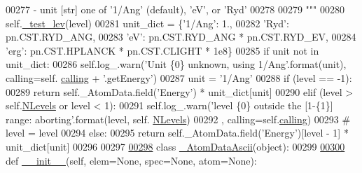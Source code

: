 \begin{DoxyCode}
{00277 \textcolor{stringliteral}{            - unit   [str] one of '1/Ang' (default), 'eV', or 'Ryd'    }
00278 \textcolor{stringliteral}{            }
00279 \textcolor{stringliteral}{        """}
00280         self.\hyperlink{classpyneb_1_1core_1_1pynebcore_1_1___atom_data_fits_ae83c63a7bd651275de23e5f17ddcf999}{\_test\_lev}(level)
00281         unit\_dict = \{\textcolor{stringliteral}{'1/Ang'}: 1.,
00282                      \textcolor{stringliteral}{'Ryd'}: pn.CST.RYD\_ANG,
00283                      \textcolor{stringliteral}{'eV'}: pn.CST.RYD\_ANG * pn.CST.RYD\_EV,
00284                      \textcolor{stringliteral}{'erg'}: pn.CST.HPLANCK * pn.CST.CLIGHT * 1e8\}
00285         \textcolor{keywordflow}{if} unit \textcolor{keywordflow}{not} \textcolor{keywordflow}{in} unit\_dict:
00286             self.log\_.warn(\textcolor{stringliteral}{'Unit \{0\} unknown, using 1/Ang'}.format(unit), calling=self.
      \hyperlink{classpyneb_1_1core_1_1pynebcore_1_1___atom_data_fits_a70465eedf1ac0b8e43360bc423be9c93}{calling} + \textcolor{stringliteral}{'.getEnergy'})
00287             unit = \textcolor{stringliteral}{'1/Ang'}
00288         \textcolor{keywordflow}{if} (level == -1):
00289             \textcolor{keywordflow}{return} self.\_AtomData.field(\textcolor{stringliteral}{'Energy'}) * unit\_dict[unit]
00290         \textcolor{keywordflow}{elif} (level > self.\hyperlink{classpyneb_1_1core_1_1pynebcore_1_1___atom_data_fits_a85c3a2d0c1cdbecc851be17237caff63}{NLevels}  \textcolor{keywordflow}{or} level < 1):
00291             self.log\_.warn(\textcolor{stringliteral}{'level \{0\} outside the [1-\{1\}] range: aborting'}.format(level, self.
      \hyperlink{classpyneb_1_1core_1_1pynebcore_1_1___atom_data_fits_a85c3a2d0c1cdbecc851be17237caff63}{NLevels})
00292                                , calling=self.\hyperlink{classpyneb_1_1core_1_1pynebcore_1_1___atom_data_fits_a70465eedf1ac0b8e43360bc423be9c93}{calling})
00293 \textcolor{comment}{#                level = level %
00294         \textcolor{keywordflow}{else}:
00295             \textcolor{keywordflow}{return} self.\_AtomData.field(\textcolor{stringliteral}{'Energy'})[level - 1] * unit\_dict[unit]
00296 
00297 
\hypertarget{pynebcore_8py_source_l00298}{}\hyperlink{classpyneb_1_1core_1_1pynebcore_1_1___atom_data_ascii}{00298} \textcolor{keyword}{class }\hyperlink{classpyneb_1_1core_1_1pynebcore_1_1___atom_data_ascii}{\_AtomDataAscii}(object):
00299     
\hypertarget{pynebcore_8py_source_l00300}{}\hyperlink{classpyneb_1_1core_1_1pynebcore_1_1___atom_data_ascii_a18839ec771a0105ab111f8c6411c70e1}{00300}     \textcolor{keyword}{def }\hyperlink{classpyneb_1_1core_1_1pynebcore_1_1___atom_data_ascii_a18839ec771a0105ab111f8c6411c70e1}{\_\_init\_\_}(self, elem=None, spec=None, atom=None):
}}
\end{DoxyCode}
